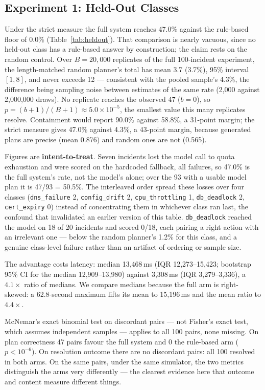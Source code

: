 \documentclass[conference]{IEEEtran}
\begin{document}
\subsection{Experiment 1: Held-Out Classes}
Under the strict measure the full system reaches 47.0\% against the
rule-based floor of 0.0\% (Table~\ref{tab:heldout}). That comparison is
nearly vacuous, since no held-out class has a rule-based answer by
construction; the claim rests on the random control. Over $B{=}20{,}000$
replicates of the full 100-incident experiment, the length-matched
random planner's total has mean 3.7 (3.7\%), 95\% interval $[1,8]$, and
never exceeds 12 --- consistent with the pooled sample's 4.3\%, the
difference being sampling noise between estimates of the same rate
(2,000 against 2,000,000 draws). No replicate reaches the observed 47
($b{=}0$), so $p=(b+1)/(B+1)\approx5.0\times10^{-5}$, the smallest value
this many replicates resolve. Containment would report 90.0\% against
58.8\%, a 31-point margin; the strict measure gives 47.0\% against
4.3\%, a 43-point margin, because generated plans are precise (mean
0.876) and random ones are not (0.565).

Figures are \textbf{intent-to-treat}. Seven incidents lost the model call
to quota exhaustion and were scored on the hardcoded fallback, all
failures, so 47.0\% is the full system's rate, not the model's alone;
over the 93 with a usable model plan it is 47/93 = 50.5\%. The
interleaved order spread these losses over four classes
(\texttt{dns\_failure} 2, \texttt{config\_drift} 2,
\texttt{cpu\_throttling} 1, \texttt{db\_deadlock} 2, \texttt{cert\_expiry}
0) instead of concentrating them in whichever class ran last, the
confound that invalidated an earlier version of this table.
\texttt{db\_deadlock} reached the model on 18 of 20 incidents and scored
0/18, each pairing a right action with an irrelevant one --- below the
random planner's 1.2\% for this class, and a genuine class-level failure
rather than an artifact of ordering or sample size.

The advantage costs latency: median 13,468\,ms (IQR 12,273--15,423;
bootstrap 95\% CI for the median 12,909--13,980) against 3,308\,ms
(IQR 3,279--3,336), a $4.1\times$ ratio of medians. We compare medians
because the full arm is right-skewed: a 62.8-second maximum lifts its
mean to 15,196\,ms and the mean ratio to $4.4\times$.

McNemar's exact binomial test on discordant pairs --- not Fisher's
exact test, which assumes independent samples --- applies to all 100
pairs, none missing. On plan correctness 47 pairs favour the full system
and 0 the rule-based arm ($p<10^{-6}$). On resolution outcome there are
no discordant pairs: all 100 resolved in both arms. On the same pairs,
under the same simulator, the two metrics distinguish the arms very
differently --- the clearest evidence here that outcome and content
measure different things.
\end{document}

